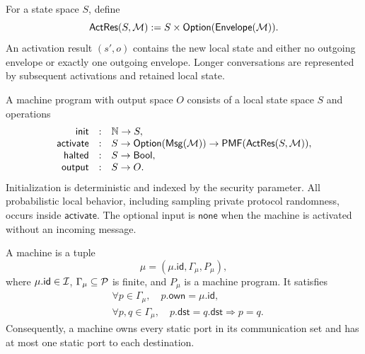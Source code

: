 \begin{definition}
\label{def:uc-activation-result}
\leanok
For a state space \(S\), define
\[
  \mathsf{ActRes}(S,\mathcal{M}):=
  S\times\mathsf{Option}(\mathsf{Envelope}(\mathcal{M})).
\]
An activation result \((s',o)\) contains the new local state and either no
outgoing envelope or exactly one outgoing envelope.  Longer conversations are
represented by subsequent activations and retained local state.
\end{definition}

\begin{definition}
\label{def:uc-machine-program}
\leanok
A machine program with output space \(O\) consists of a local state space
\(S\) and operations
\[
\begin{array}{rcl}
  \mathsf{init} &:& \mathbb{N}\to S,\\
  \mathsf{activate} &:&
    S\to\mathsf{Option}(\mathsf{Msg}(\mathcal{M}))
      \to\mathsf{PMF}(\mathsf{ActRes}(S,\mathcal{M})),\\
  \mathsf{halted} &:& S\to\mathsf{Bool},\\
  \mathsf{output} &:& S\to O.
\end{array}
\]
Initialization is deterministic and indexed by the security parameter.  All
probabilistic local behavior, including sampling private protocol randomness,
occurs inside \(\mathsf{activate}\).  The optional input is
\(\mathsf{none}\) when the machine is activated without an incoming message.
\end{definition}

\begin{definition}[Machines]
\label{def:uc-machine}
\leanok
A machine is a tuple
\[
  \mu=(\mu.\mathsf{id},\Gamma_\mu,P_\mu),
\]
where \(\mu.\mathsf{id}\in\mathcal{I}\), \(\Gamma_\mu\subseteq\mathcal{P}\) is finite,
and \(P_\mu\) is a machine program.  It satisfies
\[
\begin{aligned}
  &\forall p\in\Gamma_\mu,
    \quad p.\mathsf{own}=\mu.\mathsf{id},\\
  &\forall p,q\in\Gamma_\mu,
    \quad p.\mathsf{dst}=q.\mathsf{dst}\Longrightarrow p=q.
\end{aligned}
\]
Consequently, a machine owns every static port in its communication set and
has at most one static port to each destination.
\end{definition}

